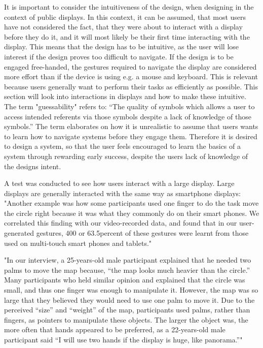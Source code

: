 It is important to consider the intuitiveness of the design, when designing in the context of public displays. In this context, it can be assumed, that most users have not considered the fact, that they were about to interact with a display before they do it, and it will most likely be their first time interacting with the display. This means that the design has to be intuitive, as the user will lose interest if the design proves too difficult to navigate. If the design is to be engaged free-handed, the gestures required to navigate the display are considered more effort than if the device is using e.g. a mouse and keyboard. This is relevant because users generally want to perform their tasks as efficiently as possible. This section will look into interactions in displays and how to make these intuitive.
The term "guessability" refers to:
“The quality of symbols which allows a user to access intended referents via those symbols despite a lack of knowledge of those symbols.”
The term elaborates on how it is unrealistic to assume that users wants to learn how to navigate systems before they engage them. Therefore it is desired to design a system, so that the user feels encouraged to learn the basics of a system through rewarding early success, despite the users lack of knowledge of the designs intent.

A test was conducted to see how users interact with a large display. Large displays are generally interacted with the same way as smartphone displays: 
"Another example was how some participants used one finger to do the task move the circle right because it was what they commonly do on their smart phones. We correlated this finding with our video-recorded data, and found that in our user-generated gestures, 400 or 63.5percent of these gestures were learnt from those used on multi-touch smart phones and tablets."


"In our interview, a 25-years-old male participant explained that he needed two
palms to move the map because, “the map looks much heavier than the circle.” Many
participants who held similar opinion and explained that the circle was small, and thus
one finger was enough to manipulate it. However, the map was so large that they
believed they would need to use one palm to move it. Due to the perceived “size” and
“weight” of the map, participants used palms, rather than fingers, as pointers to
manipulate these objects. The larger the object was, the more often that hands appeared
to be preferred, as a 22-years-old male participant said “I will use two hands if the
display is huge, like panorama.”"

